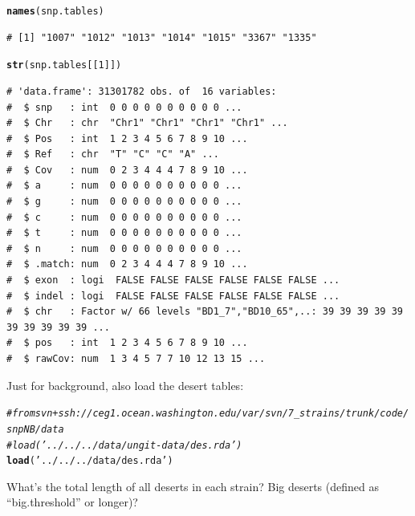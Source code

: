 \documentclass{article}\usepackage[]{graphicx}\usepackage[]{color}
\makeatletter
\newcommand{\hlnum}[1]{\textcolor[rgb]{0.686,0.059,0.569}{#1}}%
\newcommand{\hlstr}[1]{\textcolor[rgb]{0.192,0.494,0.8}{#1}}%
\newcommand{\hlcom}[1]{\textcolor[rgb]{0.678,0.584,0.686}{\textit{#1}}}%
\newcommand{\hlstd}[1]{\textcolor[rgb]{0.345,0.345,0.345}{#1}}%
\newcommand{\hlkwd}[1]{\textcolor[rgb]{0.737,0.353,0.396}{\textbf{#1}}}%
\newenvironment{kframe}{%
 \def\at@end@of@kframe{}%
 \ifinner\ifhmode%
  \def\at@end@of@kframe{\end{minipage}}%
  \begin{minipage}{\columnwidth}%
 \fi\fi%
 \def\FrameCommand##1{\hskip\@totalleftmargin \hskip-\fboxsep
 \colorbox{shadecolor}{##1}\hskip-\fboxsep
     \hskip-\linewidth \hskip-\@totalleftmargin \hskip\columnwidth}%
 \MakeFramed {\advance\hsize-\width
   \@totalleftmargin\z@ \linewidth\hsize
   \@setminipage}}%
 {\par\unskip\endMakeFramed%
 \at@end@of@kframe}
\newenvironment{knitrout}{}{} %
\makeatother
\begin{document}
\begin{knitrout}\footnotesize
{}\color{fgcolor}\begin{kframe}
\begin{alltt}
\hlkwd{names}\hlstd{(snp.tables)}
\end{alltt}
\begin{verbatim}
# [1] "1007" "1012" "1013" "1014" "1015" "3367" "1335"
\end{verbatim}
\begin{alltt}
\hlkwd{str}\hlstd{(snp.tables[[}\hlnum{1}\hlstd{]])}
\end{alltt}
\begin{verbatim}
# 'data.frame':	31301782 obs. of  16 variables:
#  $ snp   : int  0 0 0 0 0 0 0 0 0 0 ...
#  $ Chr   : chr  "Chr1" "Chr1" "Chr1" "Chr1" ...
#  $ Pos   : int  1 2 3 4 5 6 7 8 9 10 ...
#  $ Ref   : chr  "T" "C" "C" "A" ...
#  $ Cov   : num  0 2 3 4 4 4 7 8 9 10 ...
#  $ a     : num  0 0 0 0 0 0 0 0 0 0 ...
#  $ g     : num  0 0 0 0 0 0 0 0 0 0 ...
#  $ c     : num  0 0 0 0 0 0 0 0 0 0 ...
#  $ t     : num  0 0 0 0 0 0 0 0 0 0 ...
#  $ n     : num  0 0 0 0 0 0 0 0 0 0 ...
#  $ .match: num  0 2 3 4 4 4 7 8 9 10 ...
#  $ exon  : logi  FALSE FALSE FALSE FALSE FALSE FALSE ...
#  $ indel : logi  FALSE FALSE FALSE FALSE FALSE FALSE ...
#  $ chr   : Factor w/ 66 levels "BD1_7","BD10_65",..: 39 39 39 39 39 39 39 39 39 39 ...
#  $ pos   : int  1 2 3 4 5 6 7 8 9 10 ...
#  $ rawCov: num  1 3 4 5 7 7 10 12 13 15 ...
\end{verbatim}
\end{kframe}
\end{knitrout}

Just for background, also load the desert tables:

\begin{knitrout}\footnotesize
{}\color{fgcolor}\begin{kframe}
\begin{alltt}
\hlcom{# from svn+ssh://ceg1.ocean.washington.edu/var/svn/7_strains/trunk/code/snpNB/data}
\hlcom{#load('../../../data/ungit-data/des.rda')}
\hlkwd{load}\hlstd{(}\hlstr{'../../../data/des.rda'}\hlstd{)}
\end{alltt}
\end{kframe}
\end{knitrout}

What's the total length of all deserts in each strain?  Big deserts (defined as ``big.threshold'' or longer)?
\end{document}
